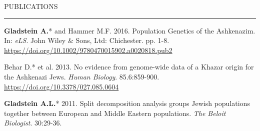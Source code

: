 \documentclass{resume} %
\renewenvironment{rSection}[1]{
\sectionskip
\textcolor{RoyalPurple}{\MakeUppercase{#1}}
\sectionlineskip
\hrule
\begin{list}{}{
\setlength{\leftmargin}{1.5em}
}
\item[]
}{
\end{list}
}
\begin{document}
\begin{rSection}{Publications}

\item \textbf{Gladstein A.}* and Hammer M.F. 2016. Population Genetics of the Ashkenazim. In: \textit{eLS}. John Wiley \& Sons, Ltd: Chichester. pp. 1-8. \url{https://doi.org/10.1002/9780470015902.a0020818.pub2}

\item Behar D.* et al. 2013. No evidence from genome-wide data of a Khazar origin for the Ashkenazi Jews. \textit{Human Biology}. 85.6:859-900. \url{https://doi.org/10.3378/027.085.0604}

\item \textbf{Gladstein A.L.}* 2011. Split decomposition analysis groups Jewish populations together between European and Middle Eastern populations. \textit{The Beloit Biologist}. 30:29-36.

\end{rSection}

\end{document}
